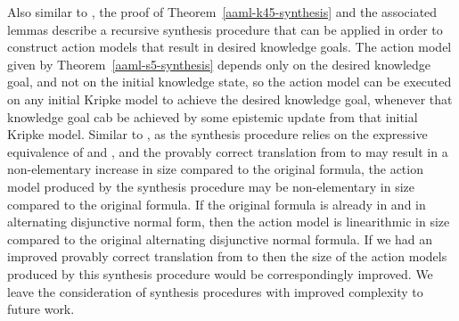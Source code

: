 Also similar to \logicAamlK{}, the proof of Theorem~\ref{aaml-k45-synthesis} and the associated lemmas describe a recursive synthesis procedure that can be applied in order to construct action models that result in desired knowledge goals.
The action model given by Theorem~\ref{aaml-s5-synthesis} depends only on the desired knowledge goal, and not on the initial knowledge state, so the action model can be executed on any initial Kripke model to achieve the desired knowledge goal, whenever that knowledge goal cab be achieved by some epistemic update from that initial Kripke model.
Similar to \logicAamlK{}, as the synthesis procedure relies on the expressive equivalence of \logicRamlKFF{} and \logicKFF{}, and the provably correct translation from \langAaml{} to \langMl{} may result in a non-elementary increase in size compared to the original formula, the action model produced by the synthesis procedure may be non-elementary in size compared to the original formula.
If the original formula is already in \langMl{} and in alternating disjunctive normal form, then the action model is linearithmic in size compared to the original alternating disjunctive normal formula.
If we had an improved provably correct translation from \langAaml{} to \langMl{} then the size of the action models produced by this synthesis procedure would be correspondingly improved.
We leave the consideration of synthesis procedures with improved complexity to future work.
